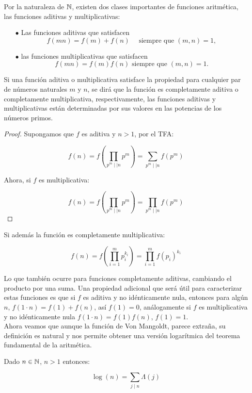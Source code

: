 Por la naturaleza de $\mathbb{N}$, existen dos clases importantes de funciones aritmética, las funciones aditivas y multiplicativas:

\begin{itemize}

\item[$\bullet$] Las funciones aditivas que satisfacen
$$
f(m n)=f(m)+f(n) \quad \text { siempre que }(m, n)=1,
$$


\item[$\bullet$] las funciones multiplicativas que satisfacen
$$
f(m n)=f(m) f(n) \text { siempre que }(m, n)=1 .
$$


\end{itemize}


Si una función aditiva o multiplicativa satisface la  propiedad para cualquier par de números naturales $m$ y $n$, se dirá que la función es completamente aditiva o completamente multiplicativa, respectivamente, las funciones aditivas y multiplicativas están determinadas por sus valores en las potencias de los números primos.\\ 

\begin{proof}
Supongamos que $f$ es aditiva y $n>1$, por el TFA:

$$f(n)=f\left(\prod_{p^m\mid\mid n}p^m\right)=\sum_{p^m\mid \mid n} f(p^{m})$$

Ahora, si $f$ es multiplicativa:

$$f(n)=f\left(\prod_{p^m\mid\mid n}p^m\right)=\prod_{p^m\mid\mid n}f(p^m) $$
\end{proof}

Si además la función es completamente multiplicativa:

$$f(n)=f\left(\prod_{i=1}^{m}p_i^{k_i}\right)=\prod_{i=1}^{m} f(p_i)^{k_i} $$

Lo que también ocurre para funciones completamente aditivas, cambiando el producto por una suma.  Una propiedad adicional que será útil para caracterizar estas funciones es que si $f$ es aditiva y no idénticamente nula, entonces para algún $n$, $f(1\cdot  n)=f(1)+f(n)$, así $f(1)=0$, análogamente si $f$ es multiplicativa y no idénticamente nula $f(1\cdot n)=f(1)f(n)$, $f(1)=1$.\\

Ahora veamos que aunque la función de Von Mangoldt, parece extraña, su definición es natural y nos permite obtener una versión logarítmica del teorema fundamental de la aritmética.

\begin{theorem}
Dado $n\in \mathbb{N}$, $n>1$ entonces:

$$\log(n)=\sum_{j\mid n}\Lambda(j)$$
\end{theorem}

